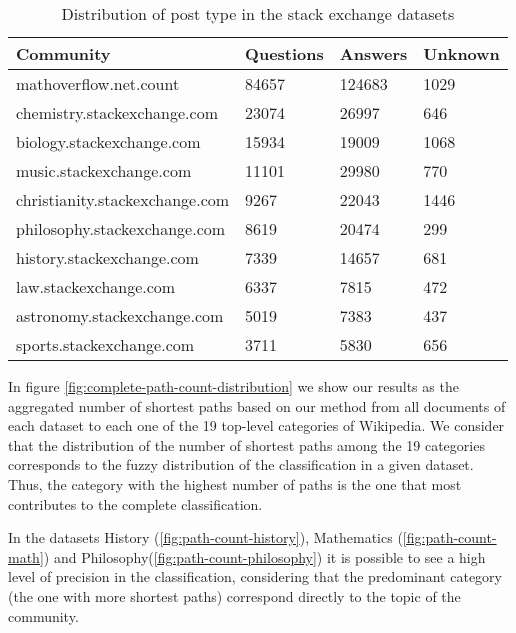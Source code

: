 \begin{table}[htpb]
\centering
\caption{Distribution of post type in the stack exchange datasets}
\label{tab:stackdist}
\begin{tabular}{@{}llll@{}}
\toprule
Community                            & Questions & Answers & Unknown \\ \midrule
mathoverflow.net.count               & 84657     & 124683  & 1029    \\
chemistry.stackexchange.com    & 23074     & 26997   & 646     \\
biology.stackexchange.com      & 15934     & 19009   & 1068    \\
music.stackexchange.com        & 11101     & 29980   & 770     \\
christianity.stackexchange.com & 9267      & 22043   & 1446    \\
philosophy.stackexchange.com   & 8619      & 20474   & 299     \\
history.stackexchange.com      & 7339      & 14657   & 681     \\
law.stackexchange.com          & 6337      & 7815    & 472     \\
astronomy.stackexchange.com    & 5019      & 7383    & 437     \\
sports.stackexchange.com       & 3711      & 5830    & 656     \\ \bottomrule
\end{tabular}%

\end{table}


In figure \ref{fig:complete-path-count-distribution} we show our results as the aggregated number of shortest paths based on our method from all documents of each dataset to each one of the 19 top-level categories of Wikipedia.
We consider that the distribution of the number of shortest paths among the 19 categories corresponds to the fuzzy distribution of the classification in a given dataset. Thus, the category with the highest number of paths is the one that most contributes to the complete classification.




In the datasets History (\ref{fig:path-count-history}), Mathematics (\ref{fig:path-count-math}) and Philosophy(\ref{fig:path-count-philosophy}) it is possible to see a high level of precision in the classification, considering that the predominant category (the one with more shortest paths) correspond directly to the topic of the community. 

